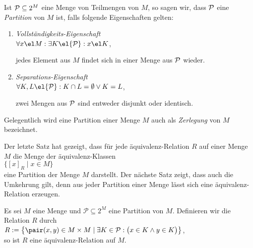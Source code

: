 \begin{Definition}[Partition] 
Ist ${\cal P} \subseteq 2^M$ eine Menge von Teilmengen von $M$, so sagen wir, dass ${\cal P}$ eine 
\emph{Partition} von $M$ ist, falls folgende Eigenschaften gelten:
\begin{enumerate}
\item \emph{Vollst\"{a}ndigkeits-Eigenschaft} 
      \\[0.2cm]
      \hspace*{1.3cm}
      $\forall x \el M : \exists K \el {\cal P} : x \el K$,

      jedes Element aus $M$ findet sich  in einer Menge aus ${\cal P}$ wieder.
\item \emph{Separations-Eigenschaft} 
      \\[0.2cm]
      \hspace*{1.3cm}
      $\forall K, L \el {\cal P} : K \cap L =\emptyset \vee K = L$,

      zwei Mengen aus ${\cal P}$ sind  entweder disjunkt oder identisch.
\end{enumerate}
Gelegentlich wird eine Partition einer Menge $M$ auch als \emph{Zerlegung} von $M$
bezeichnet.
\end{Definition}

\remark
Der letzte Satz hat gezeigt, dass f\"{u}r jede \"{a}quivalenz-Relation $R$ auf einer Menge $M$ die Menge
der \"{a}quivalenz-Klassen 
\\[0.2cm]
\hspace*{1.3cm}
$\bigl\{ [x]_R \mid x \in M \bigr\}$
\\[0.2cm]
eine Partition der Menge $M$ darstellt.  Der n\"{a}chste Satz zeigt, dass auch die Umkehrung gilt, denn
aus jeder Partition einer Menge l\"{a}sst sich eine \"{a}quivalenz-Relation erzeugen.

\begin{Satz} 
Es sei $M$ eine Menge und $\mathcal{P} \subseteq 2^M$ eine
Partition von $M$.  Definieren wir die Relation $R$ durch
\\[0.2cm]
\hspace*{1.3cm}
$R := \bigl\{ \pair(x,y) \in M \times M \mid \exists K \in \mathcal{P}: \bigl(x \in K \wedge y \in K\bigr) \bigr\}$,
\\[0.2cm]
so ist $R$ eine \"{a}quivalenz-Relation auf $M$.
\end{Satz}

